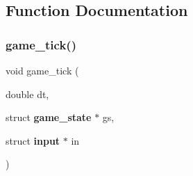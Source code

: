 \subsection{Function Documentation}
\mbox{\label{game_8c_a10f5cd5247eacbae60944fd4a9ad295a}} 
\subsubsection{game\+\_\+tick()}
{\footnotesize\ttfamily void game\+\_\+tick (\begin{DoxyParamCaption}\item[{double}]{dt,  }\item[{struct \textbf{ game\+\_\+state} $\ast$}]{gs,  }\item[{struct \textbf{ input} $\ast$}]{in }\end{DoxyParamCaption})}

